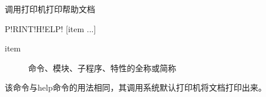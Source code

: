 \label{cmd:printhelp}

调用打印机打印帮助文档

\begin{SACSTX}
P!RINT!H!ELP! [item ...]
\end{SACSTX}

\begin{description}
\item [item] 命令、模块、子程序、特性的全称或简称
\end{description}

该命令与help命令的用法相同，其调用系统默认打印机将文档打印出来。
